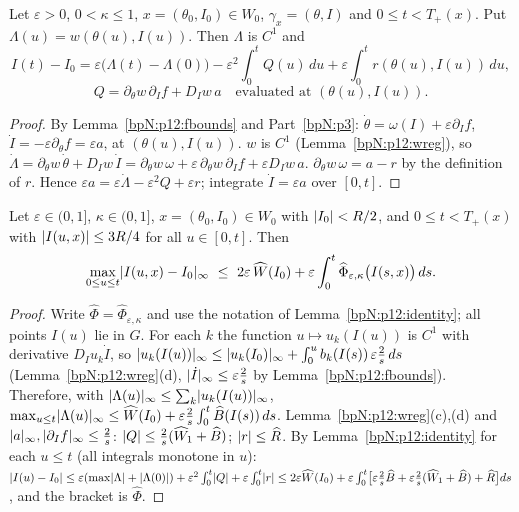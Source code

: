\begin{lemma}\label{bpN:p12:identity}
Let $\varepsilon>0$, $0<\kappa\le1$, $x=(\theta_0,I_0)\in W_0$, $\gamma_x=(\theta,I)$ and $0\le t<T_+(x)$. Put $\Lambda(u)=w(\theta(u),I(u))$. Then $\Lambda$ is $C^1$ and
\[I(t)-I_0=\varepsilon\bigl(\Lambda(t)-\Lambda(0)\bigr)-\varepsilon^2\int_0^tQ(u)\,du+\varepsilon\int_0^tr(\theta(u),I(u))\,du,\]
\[Q=\partial_\theta w\,\partial_If+D_Iw\,a\quad\text{evaluated at }(\theta(u),I(u)).\]
\end{lemma}
\begin{proof}
\label{stepN:p12:id-eq} By Lemma~\ref{bpN:p12:fbounds} and Part~\ref{bpN:p3}: $\dot\theta=\omega(I)+\varepsilon\partial_If$, $\dot I=-\varepsilon\partial_\theta f=\varepsilon a$, at $(\theta(u),I(u))$.
\label{stepN:p12:id-chain} $w$ is $C^1$ (Lemma~\ref{bpN:p12:wreg}), so $\dot\Lambda=\partial_\theta w\,\dot\theta+D_Iw\,\dot I=\partial_\theta w\,\omega+\varepsilon\,\partial_\theta w\,\partial_If+\varepsilon D_Iw\,a$.
\label{stepN:p12:id-div} $\partial_\theta w\,\omega=a-r$ by the definition of $r$. Hence $\varepsilon a=\varepsilon\dot\Lambda-\varepsilon^2Q+\varepsilon r$; integrate $\dot I=\varepsilon a$ over $[0,t]$.
\end{proof}

\begin{proposition}\label{bpN:p12:pointwise}
Let $\varepsilon\in(0,1]$, $\kappa\in(0,1]$, $x=(\theta_0,I_0)\in W_0$ with $\lvert I_0\rvert<R/2$, and $0\le t<T_+(x)$ with $\lvert I(u,x)\rvert\le3R/4$ for all $u\in[0,t]$. Then
\[\max_{0\le u\le t}\lvert I(u,x)-I_0\rvert_\infty\ \le\ 2\varepsilon\,\widehat W(I_0)+\varepsilon\int_0^t\widehat\Phi_{\varepsilon,\kappa}\bigl(I(s,x)\bigr)\,ds .\]
\end{proposition}
\begin{proof}
Write $\widehat\Phi=\widehat\Phi_{\varepsilon,\kappa}$ and use the notation of Lemma~\ref{bpN:p12:identity}; all points $I(u)$ lie in $G$.
\label{stepN:p12:pw-lambda} For each $k$ the function $u\mapsto u_k(I(u))$ is $C^1$ with derivative $D_Iu_k\dot I$, so $\lvert u_k(I(u))\rvert_\infty\le\lvert u_k(I_0)\rvert_\infty+\int_0^u b_k(I(s))\,\varepsilon\tfrac2s\,ds$ (Lemma~\ref{bpN:p12:wreg}(d), $\lvert \dot I\rvert_\infty\le\varepsilon\frac2s$ by Lemma~\ref{bpN:p12:fbounds}). Therefore, with $\lvert \Lambda(u)\rvert_\infty\le\sum_k\lvert u_k(I(u))\rvert_\infty$,
$\max_{u\le t}\lvert \Lambda(u)\rvert_\infty\le\widehat W(I_0)+\varepsilon\frac2s\int_0^t\widehat B(I(s))\,ds$.
\label{stepN:p12:pw-q} Lemma~\ref{bpN:p12:wreg}(c),(d) and $\lvert a\rvert_\infty,\lvert \partial_If\rvert_\infty\le\frac2s$: $\lvert Q\rvert\le\frac2s(\widehat W_1+\widehat B)$; $\lvert r\rvert\le\widehat R$.
\label{stepN:p12:pw-sum} By Lemma~\ref{bpN:p12:identity} for each $u\le t$ (all integrals monotone in $u$):
$\lvert I(u)-I_0\rvert\le\varepsilon(\max\lvert \Lambda\rvert+\lvert \Lambda(0)\rvert)+\varepsilon^2\int_0^t\lvert Q\rvert+\varepsilon\int_0^t\lvert r\rvert\le2\varepsilon\widehat W(I_0)+\varepsilon\int_0^t\bigl[\varepsilon\tfrac2s\widehat B+\varepsilon\tfrac2s(\widehat W_1+\widehat B)+\widehat R\bigr]ds$, and the bracket is $\widehat\Phi$.
\end{proof}

